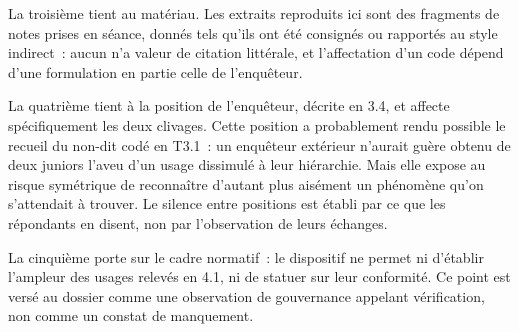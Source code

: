 La troisième tient au matériau. Les extraits reproduits ici sont des fragments de notes prises
en séance, donnés tels qu'ils ont été consignés ou rapportés au style indirect~: aucun n'a
valeur de citation littérale, et l'affectation d'un code dépend d'une formulation en partie
celle de l'enquêteur.

La quatrième tient à la position de l'enquêteur, décrite en 3.4, et affecte spécifiquement les deux clivages.
Cette position a probablement rendu possible le recueil
du non-dit codé en T3.1~: un enquêteur extérieur n'aurait guère obtenu de deux juniors
l'aveu d'un usage dissimulé à leur hiérarchie. Mais elle expose au risque symétrique de
reconnaître d'autant plus aisément un phénomène qu'on s'attendait à trouver. Le silence entre
positions est établi par ce que les répondants en disent, non par l'observation de leurs
échanges.

La cinquième porte sur le cadre normatif~: le dispositif ne permet ni d'établir l'ampleur des
usages relevés en 4.1, ni de statuer sur leur conformité. Ce point est versé au dossier comme
une observation de gouvernance appelant vérification, non comme un constat de manquement.

